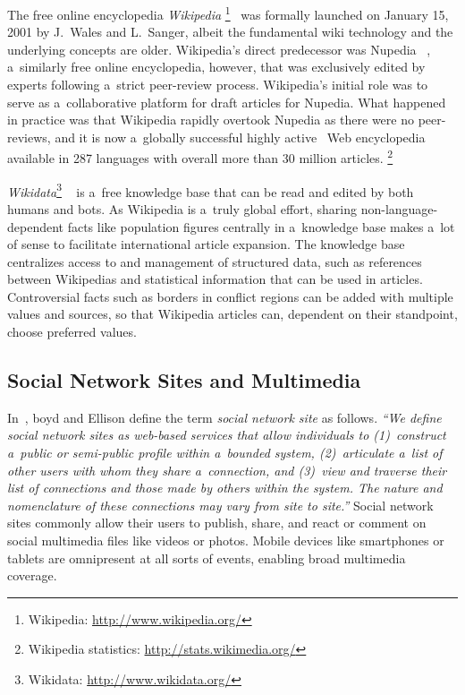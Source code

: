 \documentclass{sig-alternate}
\newcommand{\inlinelistingsize}{\fontsize{8pt}{11pt}}
\let\oldurl\url
\renewcommand{\url}[1]{\inlinelistingsize\oldurl{#1}}
\begin{document}
The free online encyclopedia \emph{Wikipedia}%
\footnote{Wikipedia: \url{http://www.wikipedia.org/}}~\cite{sanger05historywikipedia} was formally launched
on January 15, 2001 by J.~Wales
and L.~Sanger,
albeit the fundamental wiki technology
and the underlying concepts are older.
Wikipedia's direct predecessor was Nupedia%
~\cite{sanger05historywikipedia},
a~similarly free online encyclopedia,
however, that was exclusively edited by experts
following a~strict peer-review process.
Wikipedia's initial role was to serve
as a~collaborative platform for draft articles for Nupedia.
What happened in practice was that Wikipedia
rapidly overtook Nupedia as there were no peer-reviews,
and it is now a~globally successful
highly active~\cite{steiner2013bots} Web encyclopedia
available in 287 languages with overall
more than 30 million articles.%
\footnote{Wikipedia statistics: \url{http://stats.wikimedia.org/}}

\emph{Wikidata}\footnote{Wikidata: \url{http://www.wikidata.org/}}%
~\cite{vrandecic2012wikidata}
is a~free knowledge base that can be read
and edited by both humans and bots.
As Wikipedia is a~truly global effort,
sharing non-language-dependent facts
like population figures centrally
in a~knowledge base makes a~lot of sense
to facilitate international article expansion.
The knowledge base centralizes access to
and management of structured data,
such as references between Wikipedias
and statistical information that can be used in articles.
Controversial facts such as borders in conflict regions
can be added with multiple values and sources,
so that Wikipedia articles can,
dependent on their standpoint, choose preferred values.

\subsection{Social Network Sites and Multimedia}

In~\cite{boyd2007socialnetworksites},
boyd and Ellison define the term
\emph{social network site} as follows.
\textit{``We define social network sites as web-based services
that allow individuals to
\emph{(1)}~construct a~public or
semi-public profile within a~bounded system,
\emph{(2)}~articulate a~list of other users
with whom they share a~connection, and
\emph{(3)}~view and traverse their list of connections
and those made by others within the system.
The nature and nomenclature of these connections
may vary from site to site.''}
Social network sites commonly allow their users
to publish, share, and react or comment on social multimedia files
like videos or photos.
Mobile devices like smartphones or tablets
are omnipresent at all sorts of events,
enabling broad multimedia coverage.
\end{document}

